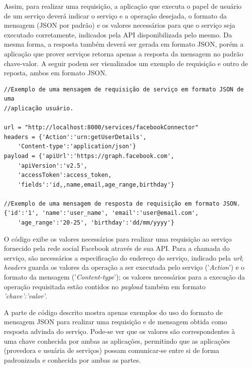 Assim, para realizar uma requisição, a aplicação que executa o papel de usuário de um serviço deverá indicar o serviço e a operação desejada, o formato da mensagem (JSON por padrão) e os valores necessários para que o serviço seja executado corretamente, indicados pela API disponibilizada pelo mesmo. Da mesma forma, a resposta também deverá ser gerada em formato JSON, porém a aplicação que prover serviços retorna apenas a resposta da mensagem no padrão chave-valor. A seguir  podem ser visualizados um exemplo de requisição e outro de reposta, ambos em formato JSON.


\begin{lstlisting}
//Exemplo de uma mensagem de requisição de serviço em formato JSON de uma 
//aplicação usuário.

url = "http://localhost:8000/services/facebookConnector"
headers = {'Action':'urn:getUserDetails', 
	'Content-type':'application/json'}
payload = {'apiUrl':'https://graph.facebook.com', 
	'apiVersion':'v2.5',
	'accessToken':access_token,
	'fields':'id,,name,email,age_range,birthday'}

//Exemplo de uma mensagem de resposta de requisição em formato JSON.
{'id':'1', 'name':'user_name', 'email':'user@email.com', 
	'age_range':'20-25', 'birthday':'dd/mm/yyyy'}
\end{lstlisting}

O código exibe os valores necessários para realizar uma requisição ao serviço fornecido pela rede social Facebook através de sua API. Para a chamada do serviço, são necessários a especificação do endereço do serviço, indicado pela \textit{url}; \textit{headers} guarda os valores da operação a ser executada pelo serviço ('\textit{Action}') e o formato da mensagem ('\textit{Content-type}'); os valores necessários para a execução da operação requisitada estão contidos no \textit{payload} também em formato \textit{{'chave':'valor'}}.

A parte de código descrito mostra apenas exemplos do uso do formato de mensagem JSON para realizar uma requisição e de mensagem obtida como resposta advinda do serviço. Pode-se ver que os valores são correspondentes à uma chave conhecida por ambas as aplicações, permitindo que as aplicações (provedora e usuária de serviços) possam comunicar-se entre si de forma padronizada e conhecida por ambas as partes.

